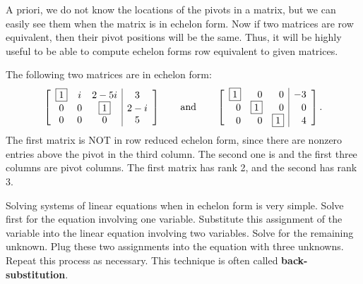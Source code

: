 A priori, we do not know the locations of the pivots in a matrix, but we can easily see them when the matrix is in echelon form. Now if two matrices are row equivalent, then their pivot positions will be the same. Thus, it will be highly useful to be able to compute echelon forms row equivalent to given matrices.\\

\begin{Exam} The following two matrices are in echelon form: %
\[\mtx{ccc|c}{\fbox{$1$}&i&2-5i&3\\0&0&\fbox{$1$}&2-i\\0&0&0&5} \qquad\text{and}\qquad \mtx{rrr|r}{ \fbox{$1$} & 0 & 0 & -3 \\ 0 & \fbox{$1$} & 0 & 0 \\ 0 & 0 & \fbox{$1$} & 4}.\] The first matrix is NOT in row reduced echelon form, since there are nonzero entries above the pivot in the third column. The second one is and the first three columns are pivot columns. The first matrix has rank 2, and the second has rank 3.
\end{Exam}\vs

Solving systems of linear equations when in echelon form is very simple. Solve first for the equation involving one variable. Substitute this assignment of the variable into the linear equation involving two variables. Solve for the remaining unknown. Plug these two assignments into the equation with three unknowns. Repeat this process as necessary. This technique is often called \textbf{back-substitution}.\\


